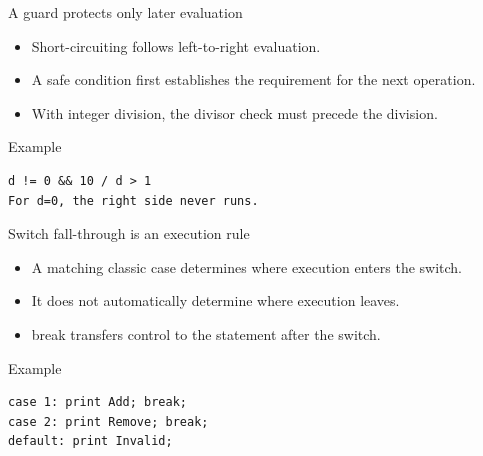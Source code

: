 \documentclass[10pt,aspectratio=169]{beamer}
\begin{document}
\begin{frame}[fragile,t]{A guard protects only later evaluation}
\begin{itemize}
\item Short-circuiting follows left-to-right evaluation.
\item A safe condition first establishes the requirement for the next operation.
\item With integer division, the divisor check must precede the division.
\end{itemize}
\vspace{1mm}\begin{block}{Example}
\begin{lstlisting}
d != 0 && 10 / d > 1
For d=0, the right side never runs.
\end{lstlisting}
\end{block}
\end{frame}

\begin{frame}[fragile,t]{Switch fall-through is an execution rule}
\begin{itemize}
\item A matching classic case determines where execution enters the switch.
\item It does not automatically determine where execution leaves.
\item break transfers control to the statement after the switch.
\end{itemize}
\vspace{1mm}\begin{block}{Example}
\begin{lstlisting}
case 1: print Add; break;
case 2: print Remove; break;
default: print Invalid;
\end{lstlisting}
\end{block}
\end{frame}
\end{document}
